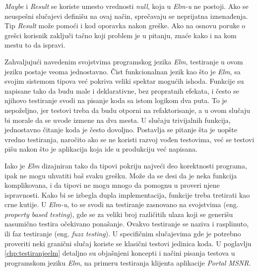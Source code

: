 \documentclass[12pt,oneside]{memoir}
\begin{document}
\par \emph{Maybe} i \emph{Result} se koriste umesto vrednosti \emph{null}, koja u \emph{Elm-u} ne postoji. Ako se neuspešni slučajevi definišu na ovaj način, sprečavaju se neprijatna iznenađenja. Tip \emph{Result} može pomoći i kod oporavka nakon greške. Ako na osnovu poruke o grešci korisnik zaključi tačno koji problem je u pitanju, znaće kako i na kom mestu to da ispravi. 
\par Zahvaljujući navedenim svojstvima programskog jezika \emph{Elm}, testiranje u ovom jeziku postaje veoma jednostavno. Čist funkcionalnan jezik kao što je \emph{Elm}, sa svojim sistemom tipova već pokriva veliki spektar mogućih ishoda. Funkcije su napisane tako da budu male i deklarativne, bez propratnih efekata, i često se njihovo testiranje svodi na pisanje koda sa istom logikom dva puta. To je nepoželjno, jer testovi treba da budu otporni na refaktorisanje, a u ovom slučaju bi morale da se uvode izmene na dva mesta. U slučaju trivijalnih funkcija, jednostavno čitanje koda je često dovoljno. Postavlja se pitanje šta je uopšte vredno testiranja, naročito ako se ne koristi razvoj vođen testovima, već se testovi pišu nakon što je aplikacija koja ide u produkciju već napisana.
\par Iako je \emph{Elm} dizajniran tako da tipovi pokriju najveći deo korektnosti programa, ipak ne mogu uhvatiti baš svaku grešku. Može da se desi da je neka funkcija komplikovana, i da tipovi ne mogu mnogo da pomognu u proveri njene ispravnosti. Kako bi se izbegla dupla implementacija, funkcije treba tretirati kao crne kutije. U \emph{Elm-u}, to se svodi na testiranje zasnovano na svojstvima (eng. \emph{property based testing}), gde se za veliki broj različitih ulaza koji se generišu nasumično testira očekivano ponašanje. Ovakvo testiranje se naziva i rasplinuto, ili faz testiranje (eng. \emph{fuzz testing}). U specifičnim slučajevima gde je potrebno proveriti neki granični slučaj koriste se klasični testovi jedinica koda. U poglavlju \ref{chp:testiranjeelm} detaljno su objašnjeni koncepti i načini pisanja testova u programskom jeziku \emph{Elm}, na primeru testiranja klijenta aplikacije \emph{Portal MSNR}.

\end{document}
